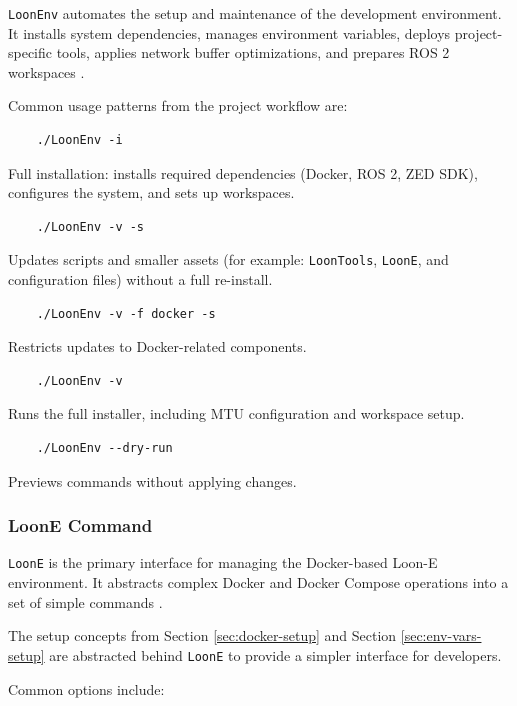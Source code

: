 \texttt{LoonEnv} automates the setup and maintenance of the development environment. It installs system dependencies, manages environment variables, deploys project-specific tools, applies network buffer optimizations, and prepares ROS 2 workspaces \autocite{LOONENV}.

Common usage patterns from the project workflow are:

\begin{verbatim}
    ./LoonEnv -i
\end{verbatim}

Full installation: installs required dependencies (Docker, ROS 2, ZED SDK), configures the system, and sets up workspaces.

\begin{verbatim}
    ./LoonEnv -v -s
\end{verbatim}

Updates scripts and smaller assets (for example: \texttt{LoonTools}, \texttt{LoonE}, and configuration files) without a full re-install.

\begin{verbatim}
    ./LoonEnv -v -f docker -s
\end{verbatim}

Restricts updates to Docker-related components.

\begin{verbatim}
    ./LoonEnv -v
\end{verbatim}

Runs the full installer, including MTU configuration and workspace setup.

\begin{verbatim}
    ./LoonEnv --dry-run
\end{verbatim}

Previews commands without applying changes.

\subsubsection{LoonE Command}

\texttt{LoonE} is the primary interface for managing the Docker-based Loon-E environment. It abstracts complex Docker and Docker Compose operations into a set of simple commands \autocite{LOONENV}.

The setup concepts from Section \ref{sec:docker-setup} and Section \ref{sec:env-vars-setup} are abstracted behind \texttt{LoonE} to provide a simpler interface for developers.

Common options include:

